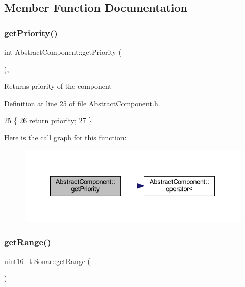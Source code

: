 \subsection{Member Function Documentation}
\mbox{\label{class_abstract_component_ac0b440d1d642ff1292ec3c544d75a8f1}} 
\subsubsection{\texorpdfstring{get\+Priority()}{getPriority()}}
{\footnotesize\ttfamily int Abstract\+Component\+::get\+Priority (\begin{DoxyParamCaption}{ }\end{DoxyParamCaption})\hspace{0.3cm}{\ttfamily [inline]}, {\ttfamily [inherited]}}

\begin{DoxyReturn}{Returns}
priority of the component 
\end{DoxyReturn}


Definition at line 25 of file Abstract\+Component.\+h.


\begin{DoxyCode}
25                       \{
26         \textcolor{keywordflow}{return} \hyperlink{class_abstract_component_aff57dfa5f31be093a06b55560e33fb95}{priority};
27     \}
\end{DoxyCode}
Here is the call graph for this function\+:
\nopagebreak
\begin{figure}[H]
\begin{center}
\leavevmode
\includegraphics[width=334pt]{class_abstract_component_ac0b440d1d642ff1292ec3c544d75a8f1_cgraph}
\end{center}
\end{figure}
\mbox{\label{class_sonar_a7a641bcfac1967fbc42eea2ab70886dc}} 
\subsubsection{\texorpdfstring{get\+Range()}{getRange()}}
{\footnotesize\ttfamily uint16\+\_\+t Sonar\+::get\+Range (\begin{DoxyParamCaption}{ }\end{DoxyParamCaption})}

